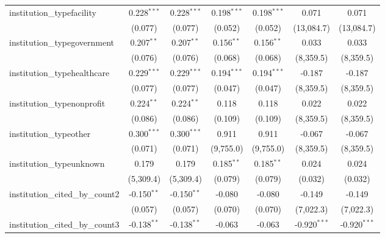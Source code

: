\begin{tabular}{lcccccc}
   institution\_typefacility             & 0.228$^{***}$ & 0.228$^{***}$ & 0.198$^{***}$  & 0.198$^{***}$  & 0.071          & 0.071\\   
                                         & (0.077)       & (0.077)       & (0.052)        & (0.052)        & (13,084.7)     & (13,084.7)\\   
   institution\_typegovernment           & 0.207$^{**}$  & 0.207$^{**}$  & 0.156$^{**}$   & 0.156$^{**}$   & 0.033          & 0.033\\   
                                         & (0.076)       & (0.076)       & (0.068)        & (0.068)        & (8,359.5)      & (8,359.5)\\   
   institution\_typehealthcare           & 0.229$^{***}$ & 0.229$^{***}$ & 0.194$^{***}$  & 0.194$^{***}$  & -0.187         & -0.187\\   
                                         & (0.077)       & (0.077)       & (0.047)        & (0.047)        & (8,359.5)      & (8,359.5)\\   
   institution\_typenonprofit            & 0.224$^{**}$  & 0.224$^{**}$  & 0.118          & 0.118          & 0.022          & 0.022\\   
                                         & (0.086)       & (0.086)       & (0.109)        & (0.109)        & (8,359.5)      & (8,359.5)\\   
   institution\_typeother                & 0.300$^{***}$ & 0.300$^{***}$ & 0.911          & 0.911          & -0.067         & -0.067\\   
                                         & (0.071)       & (0.071)       & (9,755.0)      & (9,755.0)      & (8,359.5)      & (8,359.5)\\   
   institution\_typeunknown              & 0.179         & 0.179         & 0.185$^{**}$   & 0.185$^{**}$   & 0.024          & 0.024\\   
                                         & (5,309.4)     & (5,309.4)     & (0.079)        & (0.079)        & (0.032)        & (0.032)\\   
   institution\_cited\_by\_count2        & -0.150$^{**}$ & -0.150$^{**}$ & -0.080         & -0.080         & -0.149         & -0.149\\   
                                         & (0.057)       & (0.057)       & (0.070)        & (0.070)        & (7,022.3)      & (7,022.3)\\   
   institution\_cited\_by\_count3        & -0.138$^{**}$ & -0.138$^{**}$ & -0.063         & -0.063         & -0.920$^{***}$ & -0.920$^{***}$\\   

\end{tabular}
